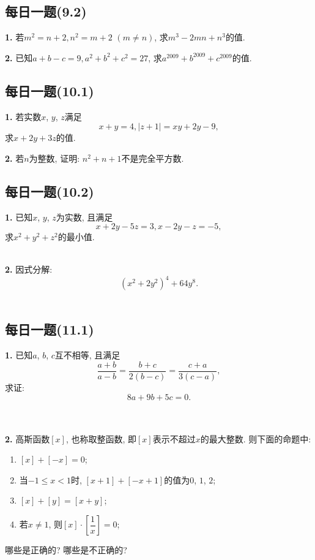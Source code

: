 \documentclass{article}
\begin{document}
{\centering\subsection*{每日一题(9.2)}}
\textbf{1. }若$m^2=n+2, n^2=m+2$ $(m\neq n)$, 求$m^3-2mn+n^3$的值.\\\par
\textbf{2. }已知$a+b-c=9, a^2+b^2+c^2=27$, 求$a^{2009}+b^{2009}+c^{2009}$的值.\\

{\centering\subsection*{每日一题(10.1)}}
\textbf{1. }若实数$x$, $y$, $z$满足
\[x+y=4, |z+1|=xy+2y-9,\]
求$x+2y+3z$的值.\\\par
\textbf{2. }若$n$为整数, 证明: $n^2+n+1$不是完全平方数. \\

{\centering\subsection*{每日一题(10.2)}}
\textbf{1. }已知$x$, $y$, $z$为实数, 且满足
\[x+2y-5z=3, x-2y-z=-5,\]
求$x^2+y^2+z^2$的最小值.\\
\\\par
\textbf{2. }因式分解:
\[\left(x^2+2y^2\right)^4+64y^8.\]
\\

{\centering\subsection*{每日一题(11.1)}}
\textbf{1. }已知$a$, $b$, $c$互不相等, 且满足
\[\frac{a+b}{a-b}=\frac{b+c}{2(b-c)}=\frac{c+a}{3(c-a)},\]
求证:
\[8a+9b+5c=0.\]\\
\\\par
\textbf{2. }高斯函数$[x]$, 也称取整函数, 即$[x]$表示不超过$x$的最大整数. 则下面的命题中: 
\begin{enumerate}[noitemsep,label={(\arabic*)}]
	\item $[x]+[-x]=0$;
	\item 当$-1\le x<1$时, $[x+1]+[-x+1]$的值为$0$, $1$, $2$;
	\item $[x]+[y]=[x+y]$;
	\item 若$x\neq 1$, 则$[x]\cdot\left[\dfrac{1}{x}\right]=0$;
\end{enumerate}
哪些是正确的? 哪些是不正确的?\\
\end{document}
